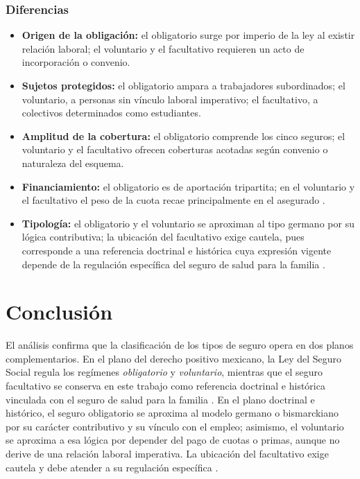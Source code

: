 \documentclass[12pt,letterpaper,oneside]{article}
\begin{document}
\subsubsection*{Diferencias}
\begin{itemize}
  \item \textbf{Origen de la obligación:} el obligatorio surge por imperio de la ley al existir relación laboral; el voluntario y el facultativo requieren un acto de incorporación o convenio.
  \item \textbf{Sujetos protegidos:} el obligatorio ampara a trabajadores subordinados; el voluntario, a personas sin vínculo laboral imperativo; el facultativo, a colectivos determinados como estudiantes.
  \item \textbf{Amplitud de la cobertura:} el obligatorio comprende los cinco seguros; el voluntario y el facultativo ofrecen coberturas acotadas según convenio o naturaleza del esquema.
  \item \textbf{Financiamiento:} el obligatorio es de aportación tripartita; en el voluntario y el facultativo el peso de la cuota recae principalmente en el asegurado \citep{lss2026,bricenoRuiz2011}.
  \item \textbf{Tipología:} el obligatorio y el voluntario se aproximan al tipo germano por su lógica contributiva; la ubicación del facultativo exige cautela, pues corresponde a una referencia doctrinal e histórica cuya expresión vigente depende de la regulación específica del seguro de salud para la familia \citep{bricenoRuiz2011,cotonietoMartinez2021,gonzalezCarvallo2024}.
\end{itemize}

\clearpage
\section{Conclusión}

El análisis confirma que la clasificación de los tipos de seguro opera en dos planos complementarios. En el plano del derecho positivo mexicano, la Ley del Seguro Social regula los regímenes \emph{obligatorio} y \emph{voluntario}, mientras que el seguro facultativo se conserva en este trabajo como referencia doctrinal e histórica vinculada con el seguro de salud para la familia \citep{lss2026,bricenoRuiz2011}. En el plano doctrinal e histórico, el seguro obligatorio se aproxima al modelo germano o bismarckiano por su carácter contributivo y su vínculo con el empleo; asimismo, el voluntario se aproxima a esa lógica por depender del pago de cuotas o primas, aunque no derive de una relación laboral imperativa. La ubicación del facultativo exige cautela y debe atender a su regulación específica \citep{bricenoRuiz2011,cotonietoMartinez2021,gonzalezCarvallo2024}.
\end{document}
